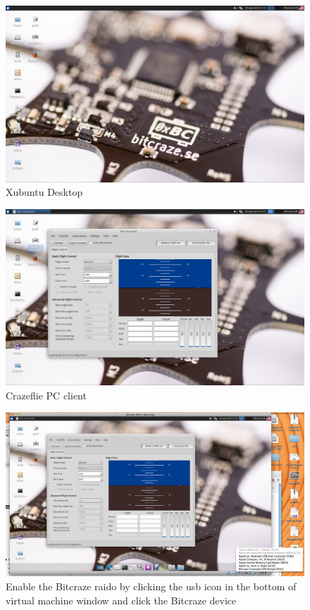 \documentclass[11pt]{article}
\begin{document}
\begin{figure}[h]
\includegraphics[width=\linewidth]{desktop.png}
\caption{Xubuntu Desktop}
\label{fig:desktop}
\end{figure}

\begin{figure}[h]
\includegraphics[width=\linewidth]{pcgui.png}
\caption{Crazeflie PC client}
\label{fig:pcgui}
\end{figure}

\begin{figure}[h]
\includegraphics[width=\linewidth]{radiousb.png}
\caption{Enable the Bitcraze raido by clicking the usb icon in the bottom of virtual machine window and click the Bitcraze device}
\label{fig:radiousb}
\end{figure}
\end{document}
